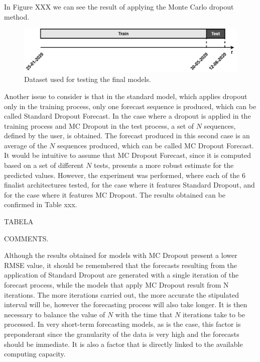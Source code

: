 In Figure XXX we can see the result of applying the Monte Carlo dropout method.

\begin{figure}[h!]
    \centering
    \begin{center}
    \includegraphics[width=1\textwidth]{Images/test2.png}
    \caption{Dataset used for testing the final models.}
    \label{test}
    \end{center}
\end{figure}


Another issue to consider is that in the standard model, which applies dropout only in the training process, only one forecast sequence is produced, which can be called Standard Dropout Forecast. In the case where a dropout is applied in the training process and MC Dropout in the test process, a set of $N$ sequences, defined by the user, is obtained. The forecast produced in this second case is an average of the $N$ sequences produced, which can be called MC Dropout Forecast. It would be intuitive to assume that MC Dropout Forecast, since it is computed based on a set of different $N$ tests, presents a more robust estimate for the predicted values. However, the experiment was performed, where each of the 6 finalist architectures tested, for the case where it features Standard Dropout, and for the case where it features MC Dropout. The results obtained can be confirmed in Table xxx. 

TABELA


COMMENTS.

Although the results obtained for models with MC Dropout present a lower \ac{RMSE} value, it should be remembered that the forecasts resulting from the application of Standard Dropout are generated with a single iteration of the forecast process, while the models that apply MC Dropout result from N iterations. The more iterations carried out, the more accurate the stipulated interval will be, however the forecasting process will also take longer. It is then necessary to balance the value of $N$ with the time that $N$ iterations take to be processed. In very short-term forecasting models, as is the case, this factor is preponderant since the granularity of the data is very high and the forecasts should be immediate. It is also a factor that is directly linked to the available computing capacity.


